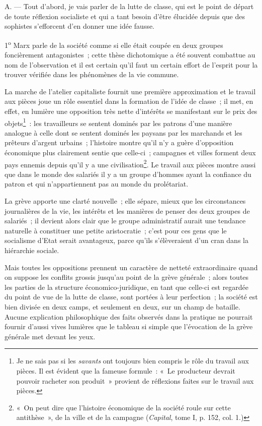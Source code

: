 \documentclass[french,twoside]{book} %
\begin{document}
\noindent A. — Tout d’abord, je vais parler de la lutte de classe, qui est le point de départ de toute réflexion socialiste et qui a tant besoin d’être élucidée depuis que des sophistes s’efforcent d’en donner une idée fausse.\par
1\textsuperscript{o} Marx parle de la société comme si elle était coupée en deux groupes foncièrement antagonistes ; cette thèse dichotomique a été souvent combattue au nom de l’observation et il est certain qu’il faut un certain effort de l’esprit pour la trouver vérifiée dans les phénomènes de la vie commune.\par
La marche de l’atelier capitaliste fournit une première approximation et le travail aux pièces joue un rôle essentiel dans la formation de l’idée de classe ; il met, en effet, en lumière une opposition très nette d’intérêts se manifestant sur le prix des objets\footnote{ \noindent Je ne sais pas si les \emph{savants} ont toujours bien compris le rôle du travail aux pièces. Il est évident que la fameuse formule : « Le producteur devrait pouvoir racheter son produit » provient de réflexions faites sur le travail aux pièces.
 } : les travailleurs se sentent dominés par les patrons d’une manière analogue à celle dont se sentent dominés les paysans par les marchands et les prêteurs d’argent urbains ; l’histoire montre qu’il n’y a guère d’opposition économique plus clairement sentie  que celle-ci ; campagnes et villes forment deux pays ennemis depuis qu’il y a une civilisation\footnote{ \noindent « On peut dire que l’histoire économique de la société roule sur cette antithèse », de la ville et de la campagne (\emph{Capital}, tome I, p. 152, col. 1.)
 }. Le travail aux pièces montre aussi que dans le monde des salariés il y a un groupe d’hommes ayant la confiance du patron et qui n’appartiennent pas au monde du prolétariat.\par
La grève apporte une clarté nouvelle ; elle sépare, mieux que les circonstances journalières de la vie, les intérêts et les manières de penser des deux groupes de salariés ; il devient alors clair que le groupe administratif aurait une tendance naturelle à constituer une petite aristocratie ; c’est pour ces gens que le socialisme d’Etat serait avantageux, parce qu’ils s’élèveraient d’un cran dans la hiérarchie sociale.\par
Mais toutes les oppositions prennent un caractère de netteté extraordinaire quand on suppose les conflits grossis jusqu’au point de la grève générale ; alors toutes les parties de la structure économico-juridique, en tant que celle-ci est regardée du point de vue de la lutte de classe, sont portées à leur perfection ; la société est bien divisée en deux camps, et seulement en deux, sur un champ de bataille. Aucune explication philosophique des faits observés dans la pratique ne pourrait fournir d’aussi vives lumières que le tableau si simple que l’évocation de la grève générale met devant les yeux.\par
\end{document}
